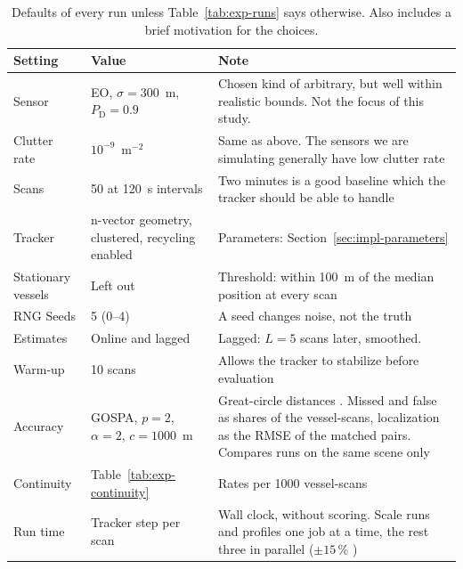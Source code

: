 \begin{table}[htbp]
\centering
\caption{Defaults of every run unless Table~\ref{tab:exp-runs} says otherwise. Also includes a brief motivation for the choices.}
\label{tab:exp-defaults}
\small
\begin{tabularx}{\textwidth}{l Y{0.7} Y{1.3}}
\toprule
Setting & Value & Note \\
\midrule
Sensor & EO, $\sigma = 300$~m, $P_{\mathrm{D}} = 0.9$ & Chosen kind of arbitrary, but well within realistic bounds. Not the focus of this study. \\
\addlinespace
Clutter rate & $10^{-9}$~m$^{-2}$ & Same as above. The sensors we are simulating generally have low clutter rate \\ %
\addlinespace
Scans & 50 at 120~s intervals & Two minutes is a good baseline which the tracker should be able to handle \\
\addlinespace
Tracker & n-vector geometry, clustered, recycling enabled & Parameters: Section~\ref{sec:impl-parameters} \\
\addlinespace
Stationary vessels & Left out & Threshold: within 100~m of the median position at every scan \\
\addlinespace
RNG Seeds & 5 (0--4) & A seed changes noise, not the truth \\
\addlinespace
Estimates & Online and lagged & Lagged: $L = 5$ scans later, smoothed. \\
\addlinespace
Warm-up & 10 scans & Allows the tracker to stabilize before evaluation \\
\addlinespace
Accuracy & GOSPA, $p = 2$, $\alpha = 2$, $c = 1000$~m & Great-circle distances . Missed and false as shares of the vessel-scans, localization as the RMSE of the matched pairs. Compares runs on the same scene only \\
\addlinespace
Continuity & Table~\ref{tab:exp-continuity} & Rates per 1000 vessel-scans \\
\addlinespace
Run time & Tracker step per scan & Wall clock, without scoring. Scale runs and profiles one job at a time, the rest three in parallel ($\pm 15$\,\% ) \\
\bottomrule
\end{tabularx}
\end{table}

